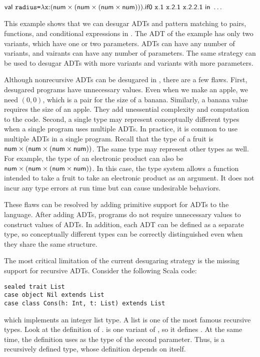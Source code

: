 $\textsf{val}\ \texttt{radius}\texttt{=}\lambda\texttt{x}{:}(\textsf{num}\times(\textsf{num}\times(\textsf{num}\times\textsf{num}))).\textsf{if0}\ \texttt{x}\textsf{.1}\ \texttt{x}\textsf{.2.1}\ \texttt{x}\textsf{.2.2.1}\ \textsf{in}\ \ldots$

This example shows that we can desugar ADTs and pattern matching to pairs,
functions, and conditional expressions in \plang. The ADT of the example has
only two variants, which have one or two parameters. ADTs can have any number of
variants, and vairants can have any number of parameters. The same strategy can be
used to desugar ADTs with more variants and variants with more parameters.

Although nonrecursive ADTs can be desugared in \plang, there are a few flaws.
First, desugared programs have unnecessary values. Even when we make an apple, we
need $(0,0)$, which is a pair for the size of a banana. Similarly, a banana
value requires the size of an apple. They add unessential complexity and
computation to the code. Second, a single type may represent conceptually
different types when a single program uses multiple ADTs. In practice, it is
common to use multiple ADTs in a single program. Recall that the type of a fruit
is $\textsf{num}\times(\textsf{num}\times(\textsf{num}\times\textsf{num}))$. The same type may represent
other types as well. For example, the type of an electronic product can also be
$\textsf{num}\times(\textsf{num}\times(\textsf{num}\times\textsf{num}))$. In this case, the type system
allows a function intended to take a fruit to take an electronic product
as an argument. It does not incur any type errors at run time but can cause
undesirable behaviors.

These flaws can be resolved by adding primitive support for ADTs to the language.
After adding ADTs,
programs do not require unnecessary values to construct values of ADTs.
In addition, each ADT can be defined as a separate type, so
conceptually different types can be correctly distinguished even when they share
the same structure.

The most critical limitation of the current desugaring strategy is the missing
support for recursive ADTs. Consider the following Scala code:

\begin{verbatim}
sealed trait List
case object Nil extends List
case class Cons(h: Int, t: List) extends List
\end{verbatim}

which implements an integer list type. A list is one of the most famous
recursive types. Look at the definition of .  is one
variant of , so it defines . At the same time, the
definition uses  as the type of the second parameter. Thus, 
is a recursively defined type, whose definition depends on itself.

